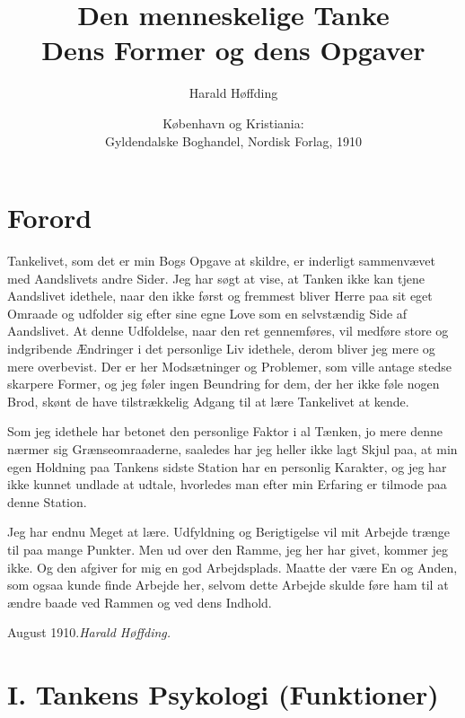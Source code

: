 \documentclass[12pt,a4paper]{book}
\title{\textbf{Den menneskelige Tanke}\\[6pt]
  \large Dens Former og dens Opgaver}
\author{Harald Høffding}
\date{København og Kristiania:\\ Gyldendalske Boghandel, Nordisk Forlag, 1910}
\begin{document}
\maketitle
\thispagestyle{empty}
\newpage

\tableofcontents
\newpage

\chapter*{Forord}
\label{ch:forord}

\noindent Tankelivet, som det er min Bogs Opgave at skildre, er
inderligt sammenvævet med Aandslivets andre Sider. Jeg har søgt at
vise, at Tanken ikke kan tjene Aandslivet idethele, naar den ikke
først og fremmest bliver Herre paa sit eget Omraade og udfolder sig
efter sine egne Love som en selvstændig Side af Aandslivet. At denne
Udfoldelse, naar den ret gennemføres, vil medføre store og indgribende
Ændringer i det personlige Liv idethele, derom bliver jeg mere og mere
overbevist. Der er her Modsætninger og Problemer, som ville antage
stedse skarpere Former, og jeg føler ingen Beundring for dem, der her
ikke føle nogen Brod, skønt de have tilstrækkelig Adgang til at lære
Tankelivet at kende.

Som jeg idethele har betonet den personlige Faktor i al Tænken, jo
mere denne nærmer sig Grænseomraaderne, saaledes har jeg heller ikke
lagt Skjul paa, at min egen Holdning paa Tankens sidste Station har en
personlig Karakter, og jeg har ikke kunnet undlade at udtale,
hvorledes man efter min Erfaring er tilmode paa denne Station.

Jeg har endnu Meget at lære. Udfyldning og Berigtigelse vil mit
Arbejde trænge til paa mange Punkter. Men ud over den Ramme, jeg her
har givet, kommer jeg ikke. Og den afgiver for mig en god
Arbejdsplads. Maatte der være En og Anden, som ogsaa kunde finde
Arbejde her, selvom dette Arbejde skulde føre ham til at ændre baade
ved Rammen og ved dens Indhold.

\bigskip
\noindent August 1910.\hfill \emph{Harald Høffding.}

\chapter*{I. Tankens Psykologi (Funktioner)}
\label{ch:psykologi}
\end{document}
